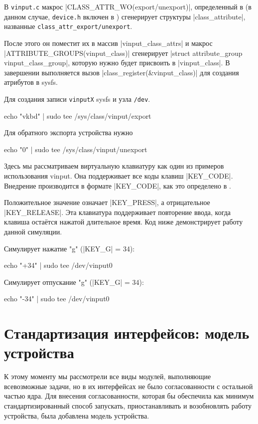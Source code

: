 \documentclass[10pt, oneside]{book}
\begin{document}
В \verb|vinput.c| макрос \cpp|CLASS_ATTR_WO(export/unexport)|, определенный в  (в данном случае, \verb|device.h| включен в  ) сгенерирует структуры \cpp|class_attribute|, названные \verb|class_attr_export/unexport|.

После этого он поместит их в массив \cpp|vinput_class_attrs| и макрос \cpp|ATTRIBUTE_GROUPS(vinput_class)| сгенерирует \cpp|struct attribute_group vinput_class_group|, которую нужно будет присвоить в \cpp|vinput_class|.
В завершении выполняется вызов \cpp|class_register(&vinput_class)| для создания атрибутов в sysfs.

Для создания записи \verb|vinputX| sysfs и узла \verb|/dev|.

\begin{codebash}
echo "vkbd" | sudo tee /sys/class/vinput/export
\end{codebash}

Для обратного экспорта устройства нужно

\begin{codebash}
echo "0" | sudo tee /sys/class/vinput/unexport
\end{codebash}


Здесь мы рассматриваем виртуальную клавиатуру как один из примеров использования vinput. Она поддерживает все коды клавиш \cpp|KEY_CODE|. Внедрение производится в формате \cpp|KEY_CODE|, как это определено в .

Положительное значение означает \cpp|KEY_PRESS|, а отрицательное \cpp|KEY_RELEASE|.
Эта клавиатура поддерживает повторение ввода, когда клавиша остаётся нажатой длительное время. Код ниже демонстрирует работу данной симуляции.

Симулирует нажатие "g" (\cpp|KEY_G| = 34):

\begin{codebash}
echo "+34" | sudo tee /dev/vinput0
\end{codebash}

Симулирует отпускание "g" (\cpp|KEY_G| = 34):

\begin{codebash}
echo "-34" | sudo tee /dev/vinput0
\end{codebash}



\section{Стандартизация интерфейсов: модель устройства}
\label{sec:device_model}
К этому моменту мы рассмотрели все виды модулей, выполняющие всевозможные задачи, но в их интерфейсах не было согласованности с остальной частью ядра. Для
внесения согласованности, которая бы обеспечила как минимум стандартизированный способ запускать, приостанавливать и возобновлять работу устройства, была добавлена модель устройства.
\end{document}
